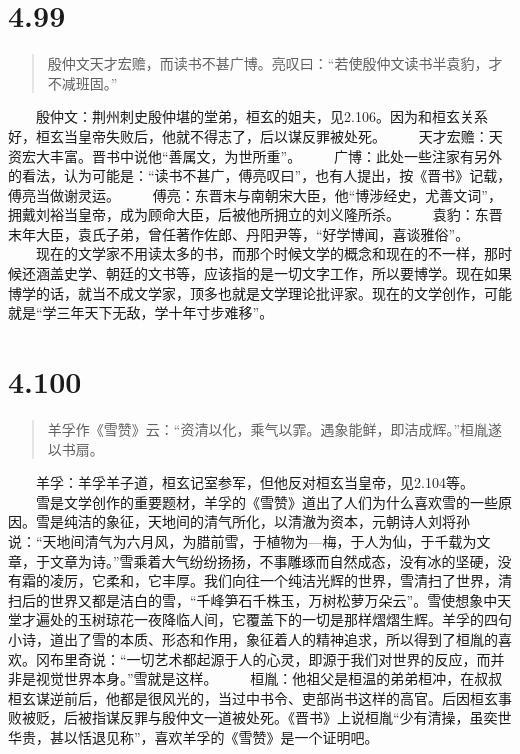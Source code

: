 \documentclass[]{book}
\begin{document}
\section{4.99}\label{section-274}

\begin{quote}
殷仲文天才宏赡，而读书不甚广博。亮叹曰：``若使殷仲文读书半袁豹，才不减班固。''
\end{quote}

　　殷仲文：荆州刺史殷仲堪的堂弟，桓玄的姐夫，见2.106。因为和桓玄关系好，桓玄当皇帝失败后，他就不得志了，后以谋反罪被处死。
　　天才宏赡：天资宏大丰富。晋书中说他``善属文，为世所重''。
　　广博：此处一些注家有另外的看法，认为可能是：``读书不甚广，傅亮叹曰''，也有人提出，按《晋书》记载，傅亮当做谢灵运。
　　傅亮：东晋末与南朝宋大臣，他``博涉经史，尤善文词''，拥戴刘裕当皇帝，成为顾命大臣，后被他所拥立的刘义隆所杀。
　　袁豹：东晋末年大臣，袁氏子弟，曾任著作佐郎、丹阳尹等，``好学博闻，喜谈雅俗''。
　　现在的文学家不用读太多的书，而那个时候文学的概念和现在的不一样，那时候还涵盖史学、朝廷的文书等，应该指的是一切文字工作，所以要博学。现在如果博学的话，就当不成文学家，顶多也就是文学理论批评家。现在的文学创作，可能就是``学三年天下无敌，学十年寸步难移''。

\section{4.100}\label{section-275}

\begin{quote}
羊孚作《雪赞》云：``资清以化，乘气以霏。遇象能鲜，即洁成辉。''桓胤遂以书扇。
\end{quote}

　　羊孚：羊孚羊子道，桓玄记室参军，但他反对桓玄当皇帝，见2.104等。
　　雪是文学创作的重要题材，羊孚的《雪赞》道出了人们为什么喜欢雪的一些原因。雪是纯洁的象征，天地间的清气所化，以清澈为资本，元朝诗人刘将孙说：``天地间清气为六月风，为腊前雪，于植物为---梅，于人为仙，于千载为文章，于文章为诗。''雪乘着大气纷纷扬扬，不事雕琢而自然成态，没有冰的坚硬，没有霜的凌厉，它柔和，它丰厚。我们向往一个纯洁光辉的世界，雪清扫了世界，清扫后的世界又都是洁白的雪，``千峰笋石千株玉，万树松萝万朵云''。雪使想象中天堂才遍处的玉树琼花一夜降临人间，它覆盖下的一切是那样熠熠生辉。羊孚的四句小诗，道出了雪的本质、形态和作用，象征着人的精神追求，所以得到了桓胤的喜欢。冈布里奇说：``一切艺术都起源于人的心灵，即源于我们对世界的反应，而并非是视觉世界本身。''雪就是这样。
　　桓胤：他祖父是桓温的弟弟桓冲，在叔叔桓玄谋逆前后，他都是很风光的，当过中书令、吏部尚书这样的高官。后因桓玄事败被贬，后被指谋反罪与殷仲文一道被处死。《晋书》上说桓胤``少有清操，虽奕世华贵，甚以恬退见称''，喜欢羊孚的《雪赞》是一个证明吧。
\end{document}
